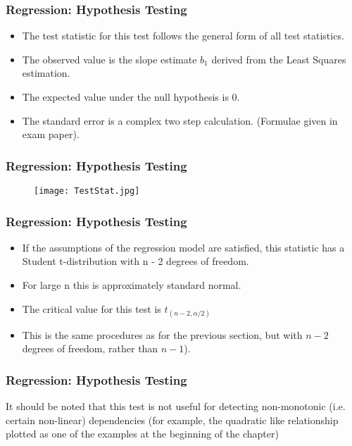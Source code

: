 \documentclass[a4]{beamer}
\begin{document}
\begin{frame}
\frametitle{Regression: Hypothesis Testing}
\begin{itemize}
\item The test statistic for this test follows the general form of all test statistics.
\item The observed value is the slope estimate $b_1$ derived from the Least Squares estimation.
\item The expected value under the null hypothesis is 0.
\item The standard error is a complex two step calculation. (Formulae given in exam paper).
\end{itemize}
\end{frame}
\begin{frame}
\frametitle{Regression: Hypothesis Testing}
\begin{figure}
  \texttt{[image: TestStat.jpg]}\\
\end{figure}
\end{frame}
\begin{frame}
\frametitle{Regression: Hypothesis Testing}
\begin{itemize}
\item If the assumptions of the regression model are satisfied, this
statistic has a Student t-distribution with n - 2 degrees of freedom.
\item For large n this is approximately standard normal.
\item The critical value for this test is $t_{(n-2,\alpha/2)}$
\item This is the same procedures as for the previous section, but with $n-2$ degrees of freedom, rather than $n-1$).
\end{itemize}
\end{frame}
\begin{frame}
\frametitle{Regression: Hypothesis Testing}
It should be noted that this test is not useful for detecting
non-monotonic (i.e. certain non-linear) dependencies (for example,
the quadratic like relationship plotted as one of the examples at
the beginning of the chapter)
\end{frame}
\end{document}
